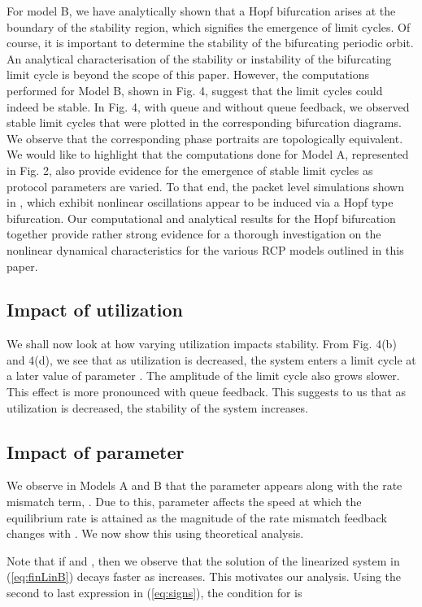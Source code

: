 \documentclass[conference]{IEEEtran}
\begin{document}
For model B, we have analytically shown that a Hopf bifurcation arises at the boundary of the stability region, 
which signifies the emergence of limit cycles. Of course, it is important to determine the 
stability of the bifurcating periodic orbit. An analytical characterisation of the stability or instability 
of the bifurcating limit cycle is beyond the scope of this paper. However, the computations performed for 
Model B, shown in Fig. 4, suggest that the limit cycles could indeed be stable. In Fig. 4, 
with queue and without queue feedback, we observed stable limit cycles that were plotted in the corresponding 
bifurcation diagrams. We observe that the corresponding phase portraits 
are topologically equivalent. We would like to highlight that the computations done for Model A, represented in Fig. 2, also provide evidence for the emergence of stable limit cycles as protocol parameters are varied. 
To that end, the packet level simulations shown in \cite{krv}, which exhibit nonlinear oscillations appear to be 
induced via a Hopf type bifurcation. Our computational and analytical results for the Hopf 
bifurcation together provide rather strong evidence for a thorough investigation on the nonlinear dynamical 
characteristics for the various RCP models outlined in this paper. 

\subsection{Impact of utilization}
We shall now look 
at how varying utilization impacts stability. From Fig. 4(b) and 4(d), we see that as utilization 
is decreased, the system enters a limit cycle at a later value of parameter . The amplitude 
of the limit cycle also grows slower. This effect is more pronounced with queue feedback. 
This suggests to us that as utilization is decreased, the stability of the system increases. 

\subsection{Impact of parameter }
We observe in Models A and B that the parameter  appears along with the rate mismatch term, 
. Due to this, parameter  affects the speed at which 
the equilibrium rate is attained as the magnitude of the rate mismatch feedback changes with 
. We now show this using theoretical analysis.

Note that if  and , 
then we observe that the solution of the linearized system in (\ref{eq:finLinB}) decays faster as  increases. This motivates our analysis. Using the second to last expression in (\ref{eq:signs}), the condition for  is
\end{document}
